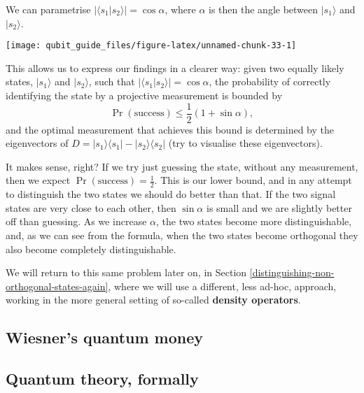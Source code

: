 \documentclass[fleqn]{article}
\renewcommand{\footnote}[1]{\en{#1}}
\begin{document}
We can parametrise \(|\langle s_1|s_2\rangle| = \cos\alpha\), where \(\alpha\) is then the angle between \(|s_1\rangle\) and \(|s_2\rangle\).

\begin{center}\texttt{[image: qubit\_guide\_files/figure-latex/unnamed-chunk-33-1]} \end{center}

This allows us to express our findings in a clearer way: given two equally likely states, \(|s_1\rangle\) and \(|s_2\rangle\), such that \(|\langle s_1|s_2\rangle| = \cos\alpha\), the probability of correctly identifying the state by a projective measurement is bounded by\footnote{Here we use that \(\cos^2\alpha+\sin^2\alpha=1\) for any \(\alpha\).}
\[
 \Pr (\text{success})
 \leqslant\frac{1}{2}(1 + \sin\alpha),
\]
and the optimal measurement that achieves this bound is determined by the eigenvectors of \(D = |s_1\rangle\langle s_1|-|s_2\rangle\langle s_2|\) (try to visualise these eigenvectors).

It makes sense, right?
If we try just guessing the state, without any measurement, then we expect \(\Pr (\text{success}) = \frac{1}{2}\).
This is our lower bound, and in any attempt to distinguish the two states we should do better than that.
If the two signal states are very close to each other, then \(\sin\alpha\) is small and we are slightly better off than guessing.
As we increase \(\alpha\), the two states become more distinguishable, and, as we can see from the formula, when the two states become orthogonal they also become completely distinguishable.

We will return to this same problem later on, in Section \ref{distinguishing-non-orthogonal-states-again}, where we will use a different, less ad-hoc, approach, working in the more general setting of so-called \textbf{density operators}.

\hypertarget{wiesners-quantum-money}{%
\subsection{Wiesner's quantum money}\label{wiesners-quantum-money}}

\hypertarget{quantum-theory-formally}{%
\subsection{Quantum theory, formally}\label{quantum-theory-formally}}
\end{document}

